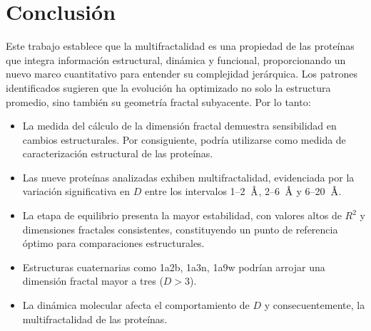 \chapter{Conclusión}

Este trabajo establece que la multifractalidad es una propiedad de las prote\'{i}nas que integra 
informaci\'{o}n estructural, din\'{a}mica y funcional, proporcionando un nuevo marco cuantitativo 
para entender su complejidad jer\'{a}rquica. Los patrones identificados sugieren que la evoluci\'{o}n 
ha optimizado no solo la estructura promedio, sino tambi\'{e}n su geometr\'{i}a fractal subyacente. 
Por lo tanto:

\begin{itemize}
	\item La medida del c\'{a}lculo de la dimensi\'{o}n fractal demuestra sensibilidad en
	 cambios estructurales. Por consiguiente, podr\'{i}a utilizarse como medida de caracterizaci\'{o}n 
	 estructural de las prote\'{i}nas.
	
	\item Las nueve prote\'{i}nas analizadas exhiben multifractalidad, evidenciada por la variaci\'{o}n 
	significativa en $D$ entre los intervalos 1--2~$\textup{\r{A}}$, 2--6~$\textup{\r{A}}$ y 6--20~$\textup{\r{A}}$.
	
	\item La etapa de equilibrio presenta la mayor estabilidad, con valores altos de $R^2$ y 
	dimensiones fractales consistentes, constituyendo un punto de referencia \'{o}ptimo para comparaciones estructurales.
	
	\item Estructuras cuaternarias como 1a2b, 1a3n, 1a9w podr\'{i}an arrojar una dimensi\'{o}n fractal mayor a tres ($D>3$).
	
	
	\item La din\'{a}mica molecular afecta el comportamiento de $D$ y consecuentemente, la multifractalidad de las prote\'{i}nas.
\end{itemize}
